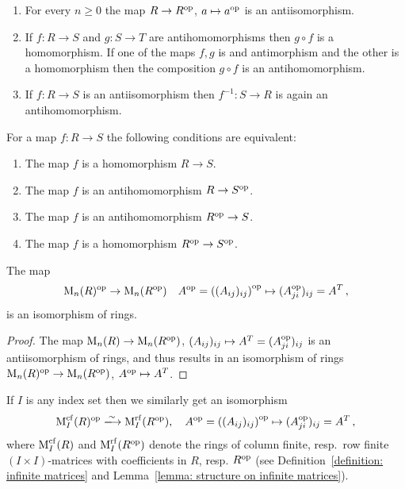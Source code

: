 \begin{example}
  \leavevmode
  \begin{enumerate}
     \item
      For every $n \geq 0$ the map $R \to R^{\operatorname{op}}$, $a \mapsto a^{\operatorname{op}}$ is an antiisomorphism.
     \item
      If $f \colon R \to S$ and $g \colon S \to T$ are antihomomorphisms then $g \circ f$ is a homomorphism.
      If one of the maps $f, g$ is and antimorphism and the other is a homomorphism then the composition $g \circ f$ is an antihomomorphism.
    \item
      If $f \colon R \to S$ is an antiisomorphism then $f^{-1} \colon S \to R$ is again an antihomomorphism.
  \end{enumerate}
\end{example}


\begin{lemma}
  For a map $f \colon R \to S$ the following conditions are equivalent:
  \begin{enumerate}
    \item
      The map $f$ is a homomorphism $R \to S$.
    \item
      The map $f$ is an antihomomorphism $R \to S^{\operatorname{op}}$.
    \item
      The map $f$ is an antihomomorphism $R^{\operatorname{op}} \to S$.
    \item
      The map $f$ is a homomorphism $R^{\operatorname{op}} \to S^{\operatorname{op}}$.
  \end{enumerate}
\end{lemma}


\begin{lemma}
  \label{lemma: op of matrix rings}
  The map
  \[
            \operatorname{M}_n(R)^{\operatorname{op}}
    \to     \operatorname{M}_n(R^{\operatorname{op}})
    \quad   A^{\operatorname{op}}
    =       \left( (A_{ij})_{ij} \right)^{{\operatorname{op}}}
    \mapsto (A_{ji}^{\operatorname{op}})_{ij}
    =       A^T \,,
  \]
  is an isomorphism of rings.
\end{lemma}


\begin{proof}
  The map $\operatorname{M}_n(R) \to \operatorname{M}_n(R^{\operatorname{op}})$, $(A_{ij})_{ij} \mapsto A^T = (A^{\operatorname{op}}_{ji})_{ij}$ is an antiisomorphism of rings, and thus results in an isomorphism of rings $\operatorname{M}_n(R)^{\operatorname{op}} \to \operatorname{M}_n(R^{\operatorname{op}})$, $A^{\operatorname{op}} \mapsto A^T$.
\end{proof}


\begin{remark}
  \label{remark: transposing infinite matrix ring opposite ring}
  If $I$ is any index set then we similarly get an isomorphism
  \[
            \Mat_I^\cf(R)^\op
    \xlongrightarrow{\sim}
            \Mat_I^{\rf}(R^\op),
    \quad   A^\op
    =       \left( (A_{ij})_{ij} \right)^{\op}
    \mapsto (A_{ji}^\op)_{ij}
    =       A^T \,,
  \]
  where $\operatorname{M}_I^{\operatorname{cf}}(R)$ and $\operatorname{M}_I^{\operatorname{rf}}(R^{\operatorname{op}})$ denote the rings of column finite, resp.\ row finite $(I \times I)$-matrices with coefficients in $R$, resp. $R^{\operatorname{op}}$ (see Definition~\ref{definition: infinite matrices} and Lemma~\ref{lemma: structure on infinite matrices}).
\end{remark}


